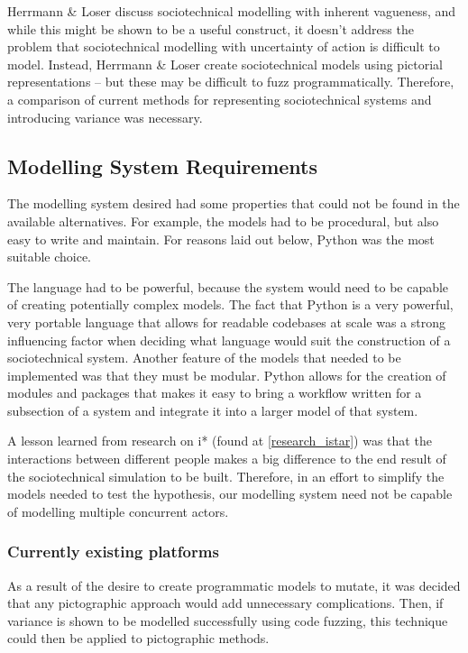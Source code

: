 \documentclass{sig-alternate}
\begin{document}

\label{related_head}
Herrmann \& Loser\cite{Herrmann1999} discuss sociotechnical modelling with inherent vagueness, and while this might be shown to be a useful construct, it doesn't address the problem that sociotechnical modelling with uncertainty of action is difficult to model. Instead, Herrmann \& Loser create sociotechnical models using pictorial representations -- but these may be difficult to fuzz programmatically. Therefore, a comparison of current methods for representing sociotechnical systems and introducing variance was necessary. \par

\subsection{Modelling System Requirements}\label{planning_modelling_requirements}
The modelling system desired had some properties that could not be found in the available alternatives. For example, the models had to be procedural, but also easy to write and maintain. For reasons laid out below, Python was the most suitable choice. \par

The language had to be powerful, because the system would need to be capable of creating potentially complex models. The fact that Python is a very powerful, very portable language that allows for readable codebases at scale was a strong influencing factor when deciding what language would suit the construction of a sociotechnical system. Another feature of the models that needed to be implemented was that they must be modular. Python allows for the creation of modules and packages that makes it easy to bring a workflow written for a subsection of a system and integrate it into a larger model of that system. \par

A lesson learned from research on i* (found at \cref{research_istar}) was that the interactions between different people makes a big difference to the end result of the sociotechnical simulation to be built. Therefore, in an effort to simplify the models needed to test the hypothesis, our modelling system need not be capable of modelling multiple concurrent actors. 

\subsubsection{Currently existing platforms}
As a result of the desire to create programmatic models to mutate, it was decided that any pictographic approach would add unnecessary complications. Then, if variance is shown to be modelled successfully using code fuzzing, this technique could then be applied to pictographic methods. \par
\end{document}
